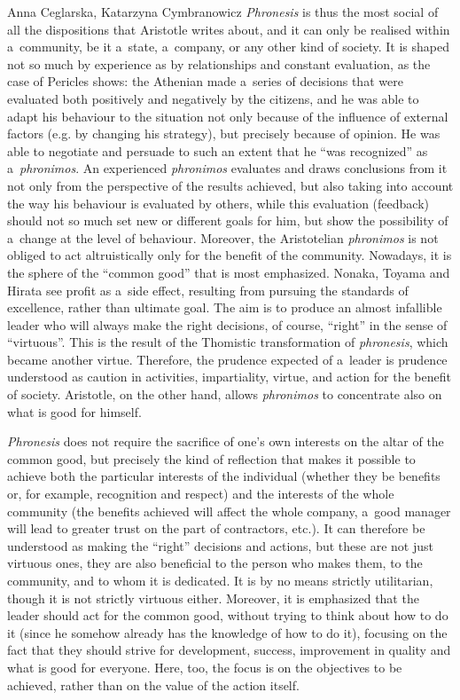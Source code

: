 \begin{artengenv2auth}{Anna Ceglarska, Katarzyna Cymbranowicz}
\textit{Phronesis} is thus the most social of all the dispositions that Aristotle writes about, and it can only be realised within a~community, be it a~state, a~company, or any other kind of society. It is shaped not so much by experience as by relationships and constant evaluation, as the case of Pericles shows: the Athenian made a~series of decisions that were evaluated both positively and negatively by the citizens, and he was able to adapt his behaviour to the situation not only because of the influence of external factors (e.g. by changing his strategy), but precisely because of opinion. He was able to negotiate and persuade to such an extent that he ``was recognized'' as a~\textit{phronimos}. An experienced \textit{phronimos} evaluates and draws conclusions from it not only from the perspective of the results achieved, but also taking into account the way his behaviour is evaluated by others, while this evaluation (feedback) should not so much set new or different goals for him, but show the possibility of a~change at the level of behaviour. Moreover, the Aristotelian \textit{phronimos} is not obliged to act altruistically only for the benefit of the community. Nowadays, it is the sphere of the ``common good'' that is most emphasized. Nonaka, Toyama and Hirata see profit as a~side effect, resulting from pursuing the standards of excellence, rather than ultimate goal. The aim is to produce an almost infallible leader who will always make the right decisions, of course, ``right'' in the sense of ``virtuous''. This is the result of the Thomistic transformation of \textit{phronesis}, which became another virtue. Therefore, the prudence expected of a~leader is prudence understood as caution in activities, impartiality, virtue, and action for the benefit of society. Aristotle, on the other hand, allows \textit{phronimos} to concentrate also on what is good for himself.



\textit{Phronesis} does not require the sacrifice of one's own interests on the altar of the common good, but precisely the kind of reflection that makes it possible to achieve both the particular interests of the individual (whether they be benefits or, for example, recognition and respect) and the interests of the whole community (the benefits achieved will affect the whole company, a~good manager will lead to greater trust on the part of contractors, etc.). It can therefore be understood as making the ``right'' decisions and actions, but these are not just virtuous ones, they are also beneficial to the person who makes them, to the community, and to whom it is dedicated. It is by no means strictly utilitarian, though it is not strictly virtuous either. Moreover, it is emphasized that the leader should act for the common good, without trying to think about how to do it (since he somehow already has the knowledge of how to do it), focusing on the fact that they should strive for development, success, improvement in quality and what is good for everyone. Here, too, the focus is on the objectives to be achieved, rather than on the value of the action itself.




\end{artengenv2auth}
